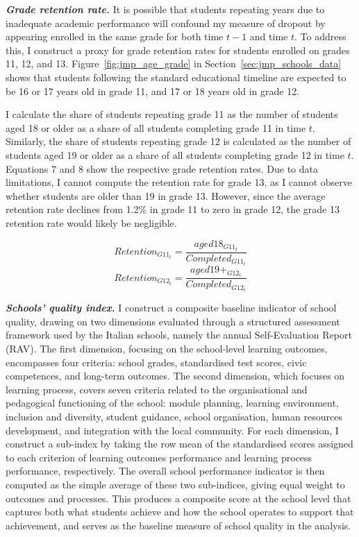 \documentclass[12pt]{article}
\theoremstyle{plain}
\theoremstyle{plain}
\theoremstyle{plain}
\theoremstyle{definition}
\theoremstyle{plain}
\theoremstyle{definition}
\theoremstyle{plain}
\theoremstyle{remark}
\theoremstyle{definition}
\theoremstyle{definition}
\theoremstyle{plain}
\begin{document}
 \textbf{\emph{Grade retention rate.}}  It is possible that students repeating years due to inadequate academic performance will confound my measure of dropout by appearing enrolled in the same grade for both time $t-1$ and time $t$. To address this, I construct a proxy for grade retention rates for students enrolled on grades 11, 12, and 13. Figure~\ref{fig:jmp_age_grade} in Section~\ref{sec:jmp_schools_data} shows that students following the standard educational timeline are expected to be 16 or 17 years old in grade 11, and 17 or 18 years old in grade 12.

I calculate the share of students repeating grade 11 as the number of students aged 18 or older as a share of all students completing grade 11 in time $t$. Similarly, the share of students repeating grade 12 is calculated as the number of students aged 19 or older as a share of all students completing grade 12 in time $t$. Equations 7 and 8 show the respective grade retention rates. Due to data limitations, I cannot compute the retention rate for grade 13, as I cannot observe whether students are older than 19 in grade 13. However, since the average retention rate declines from 1.2\% in grade 11 to zero in grade 12, the grade 13 retention rate would likely be negligible. 
 
\vspace{0.3cm}
\begin{equation}
Retention_{G11{_t}} = \frac{aged18_{G11{_t}}}{{Completed_{G11_{t}}}}
\end{equation}
\vspace{0.3cm}
\begin{equation}
Retention_{G12{_t}} = \frac{aged19+_{G12{_t}}}{{Completed_{G12_{t}}}}
\end{equation}
\vspace{0.3cm}


  \textbf{\emph{Schools' quality index.}}  I construct a composite baseline indicator of school quality, drawing on two dimensions evaluated through a structured assessment framework used by the Italian schools, namely the annual Self-Evaluation Report (RAV). The first dimension, focusing on the school-level learning outcomes, encompasses four criteria: school grades, standardised test scores, civic competences, and long-term outcomes. The second dimension, which focuses on learning process, covers seven criteria related to the organisational and pedagogical functioning of the school: module planning, learning environment, inclusion and diversity, student guidance, school organisation, human resources development, and integration with the local community. For each dimension, I construct a sub-index by taking the row mean of the standardised scores assigned to each criterion of learning outcomes performance and learning process performance, respectively. The overall school performance indicator is then computed as the simple average of these two sub-indices, giving equal weight to outcomes and processes. This produces a composite score at the school level that captures both what students achieve and how the school operates to support that achievement, and serves as the baseline measure of school quality in the analysis.
  
\end{document}
